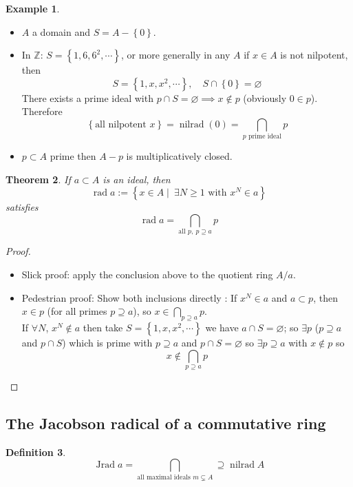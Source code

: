 \documentclass[11pt,a4paper]{article}
\theoremstyle{definition}
\newtheorem{definition}{Definition}[section]
\newtheorem{example}[definition]{Example}
\theoremstyle{plain}
\newtheorem{theorem}[definition]{Theorem}
\theoremstyle{remark}
\newcommand{\Z}{\mathbb{Z}}
\renewcommand{\set}[1]{\left\{ #1 \right\}}
\begin{document}
\begin{example}
    \begin{itemize}
        \item $A$ a domain and $S = A - \set{0}$. 
        \item In $\Z$: $S = \set{1, 6, 6^2, \cdots}$, or more generally in any $A$ if 
        $x \in A$ is not nilpotent, then 
        $$S = \set{1, x, x^2, \cdots}, \quad S \cap \set{0} = \varnothing$$
        There exists a prime ideal with $p \cap S = \varnothing \implies x \not\in p$ (obviously $0 \in p$). \\
        Therefore 
        $$\set{\text{all nilpotent } x} = \operatorname{nilrad} (0) = \bigcap_{p \text{ prime ideal}} p$$
        \item $p \subset A$ prime then $A - p$ is multiplicatively closed. 
    \end{itemize}
\end{example}

\begin{theorem}
    If $a \subset A$ is an ideal, then 
    $$\operatorname{rad} a := \set{x \in A \mid \ \exists N \geq 1 \text{ with } x^N \in a}$$
    satisfies 
    $$\operatorname{rad} a = \bigcap_{\text{all } p, \ p \supseteq a} p$$ 
\end{theorem}

\begin{proof}
    \begin{itemize}
        \item Slick proof: apply the conclusion above to the quotient ring $A / a$. 
        \item Pedestrian proof: Show both inclusions directly :
        If $x^N \in a$ and $a \subset p$, then $x \in p$ (for all primes $p \supseteq a$), so $x \in \bigcap_{p \supseteq a} p$. \\
        If $\forall N$, $x^N \not\in a$ then take $S = \set{1, x, x^2, \cdots}$ we have $a \cap S = \varnothing$; so $\exists p$ ($p \supseteq a$ and $p \cap S$)
        which is prime with $p \supseteq a$ and $p \cap S = \varnothing$ so $\exists p \supseteq a$ with $x \not\in p$ so 
        $$x \not\in \bigcap_{p \supseteq a} p$$ 
    \end{itemize}
\end{proof}

\subsection{The Jacobson radical of a commutative ring}
\begin{definition}
    $$\operatorname{Jrad} a = \bigcap_{\text{all maximal ideals } m \subsetneq A} \supseteq \operatorname{nilrad} A$$
\end{definition}
\end{document}
